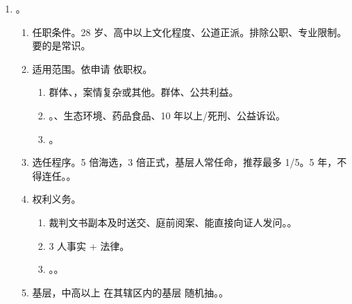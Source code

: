 \begin{enumerate}
\begin{enumerate}
\begin{enumerate}
                  \item 全体均应出席 \cuo
                \end{enumerate}
        \end{enumerate}
  \item {}。
        \begin{enumerate}
          \item 任职条件。28 岁、高中以上文化程度、公道正派。排除公职、专业限制。要的是常识。
          \item 适用范围。依申请 \hz 依职权。
                \begin{enumerate}
                  \item 群体、，案情复杂或其他。群体、公共利益。
                  \item {}。、生态环境、药品食品、10 年以上/死刑、公益诉讼。
                  \item {}。
                \end{enumerate}
          \item 选任程序。5 倍海选，3 倍正式，基层人常任命，推荐最多 1/5。5 年，不得连任。。
          \item 权利义务。
                \begin{enumerate}
                  \item 裁判文书副本及时送交、庭前阅案、能直接向证人发问。。
                  \item 3 人事实 + 法律。
                  \item {}。。
                \end{enumerate}
          \item 基层，中高以上 \yjt 在其辖区内的基层 \yjt 随机抽。。
        \end{enumerate}
\end{enumerate}
